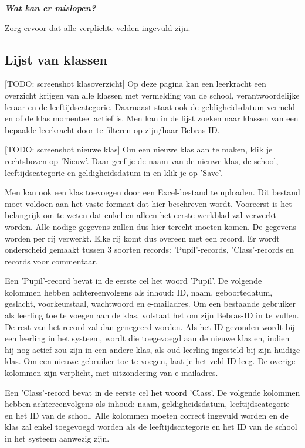 \documentclass[]{article}
\begin{document}
\textbf{\textit{Wat kan er mislopen?}}

Zorg ervoor dat alle verplichte velden ingevuld zijn.

\subsection{Lijst van klassen}

[TODO: screenshot klasoverzicht]
Op deze pagina kan een leerkracht een overzicht krijgen van alle klassen met vermelding van de school, verantwoordelijke leraar en de leeftijdscategorie. Daarnaast staat ook de geldigheidsdatum vermeld en of de klas momenteel actief is.
Men kan in de lijst zoeken naar klassen van een bepaalde leerkracht door te filteren op zijn/haar Bebras-ID.

[TODO: screenshot nieuwe klas]
Om een nieuwe klas aan te maken, klik je rechtsboven op 'Nieuw'. Daar geef je de naam van de nieuwe klas, de school, leeftijdscategorie en geldigheidsdatum in en klik je op 'Save'.

Men kan ook een klas toevoegen door een Excel-bestand te uploaden. Dit bestand moet voldoen aan het vaste formaat dat hier beschreven wordt. 
Vooreerst is het belangrijk om te weten dat enkel en alleen het eerste werkblad zal verwerkt worden. Alle nodige gegevens zullen dus hier terecht moeten komen. De gegevens worden per rij verwerkt. Elke rij komt dus overeen met een record. Er wordt onderscheid gemaakt tussen 3 soorten records: 'Pupil'-records, 'Class'-records en records voor commentaar.

Een 'Pupil'-record bevat in de eerste cel het woord 'Pupil'. De volgende kolommen hebben achtereenvolgens als inhoud: ID, naam, geboortedatum, geslacht, voorkeurstaal, wachtwoord en e-mailadres. Om een bestaande gebruiker als leerling toe te voegen aan de klas, volstaat het om zijn Bebras-ID in te vullen. De rest van het record zal dan genegeerd worden. Als het ID gevonden wordt bij een leerling in het systeem, wordt die toegevoegd aan de nieuwe klas en, indien hij nog actief zou zijn in een andere klas, als oud-leerling ingesteld bij zijn huidige klas.  
Om een nieuwe gebruiker toe te voegen, laat je het veld ID leeg. De overige kolommen zijn verplicht, met uitzondering van e-mailadres.

Een 'Class'-record bevat in de eerste cel het woord 'Class'. De volgende kolommen hebben achtereenvolgens als inhoud: naam, geldigheidsdatum, leeftijdscategorie en het ID van de school. Alle kolommen moeten correct ingevuld worden en de klas zal enkel toegevoegd worden als de leeftijdscategorie en het ID van de school in het systeem aanwezig zijn. 
\end{document}
